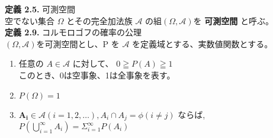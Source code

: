 \documentclass[dvipdfmx,10pt, a4j]{jarticle}
\theoremstyle{definition}
\begin{document}
    \noindent
    \textbf{定義 2.5.} 可測空間\\
    空でない集合 $\Omega$ とその完全加法族 $\mathcal{A}$ の組$(\Omega, \mathcal{A})$を \textbf{可測空間} と呼ぶ。\\

    \noindent
    \textbf{定義 2.9.} コルモロゴフの確率の公理\\
    $(\Omega, \mathcal{A})$を可測空間とし、P を $\mathcal{A}$ を定義域とする、実数値関数とする。
    \begin{enumerate}
        \renewcommand{\labelenumi}{\roman{enumi})}
        \item 任意の $A \in \mathcal{A}$ に対して、 $0 \geqq P(A) \geqq 1$\\
        このとき、0は空事象、1は全事象を表す。\\
        \item $P(\Omega) = 1$
        \item $\bm{A_i} \in \mathcal{A}(i = 1, 2, \dots), {A_i} \cap {A_j} = \phi (i \neq j)$ ならば, \\
        $P\left(\displaystyle\bigcup_{i=1}^{\infty}{A_i}\right) = \Sigma_{i=1}^{\infty}P(A_i)$
    \end{enumerate}

\end{document}
